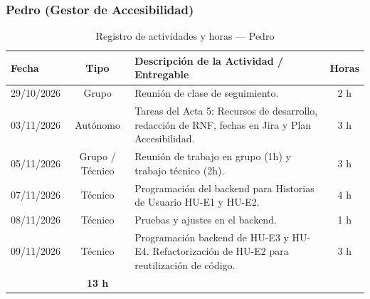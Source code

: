 \subsubsection{Pedro (Gestor de Accesibilidad)}
\begin{table}[H]
\centering
\small
{}
\begin{tabularx}{\textwidth}{l c X c}
\toprule
\rowcolor{verdeApagado}
\textbf{\color{textoOscuro}Fecha} & \textbf{\color{textoOscuro}Tipo} & \textbf{\color{textoOscuro}Descripción de la Actividad / Entregable} & \textbf{\color{textoOscuro}Horas} \\
\midrule
29/10/2026 & Grupo & Reunión de clase de seguimiento. & 2 h \\
03/11/2026 & Autónomo & Tareas del Acta 5: Recursos de desarrollo, redacción de RNF, fechas en Jira y Plan Accesibilidad. & 3 h \\
05/11/2026 & Grupo / Técnico & Reunión de trabajo en grupo (1h) y trabajo técnico (2h). & 3 h \\
07/11/2026 & Técnico & Programación del backend para Historias de Usuario HU-E1 y HU-E2. & 4 h \\
08/11/2026 & Técnico & Pruebas y ajustes en el backend. & 1 h \\
09/11/2026 & Técnico & Programación backend de HU-E3 y HU-E4. Refactorización de HU-E2 para reutilización de código. & 3 h \\
\midrule
\rowcolor{azulclaro!60}
\multicolumn{3}{l}{\textbf{\color{textoOscuro}Total Horas Dedicadas — Pedro:}} & \textbf{\color{textoOscuro}13 h} \\
\bottomrule
\end{tabularx}
\caption{Registro de actividades y horas — Pedro}
\end{table}

